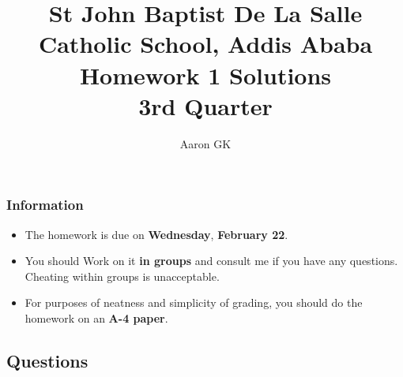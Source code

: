 \documentclass[9pt,addpoints]{exam}
\author{Aaron GK}
\begin{document}
	\title{St John Baptist De La Salle Catholic School, Addis Ababa\\
		\large Homework 1 Solutions \\
		3rd Quarter}
	\maketitle
	\begin{center}
		\subsubsection*{Information}
		\begin{itemize}
			\item The homework is due on \textbf{Wednesday}, \textbf{February 22}.
			\item You should Work on it \textbf{in groups} and consult me if you have any questions. Cheating within groups is unacceptable.
			\item For purposes of neatness and simplicity of grading, you should do the homework on an \textbf{A-4 paper}.
		\end{itemize}
	\end{center}
	\begin{center}
		\subsection*{Questions}
	\end{center}
\end{document}
